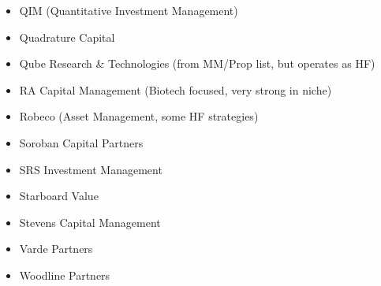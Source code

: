 \documentclass[11pt,a4paper]{article}
\begin{document}
\begin{multicols}{3}
\begin{itemize}[label=\textbullet, leftmargin=*, itemsep=1pt, parsep=0pt]
    \item QIM (Quantitative Investment Management)
    \item Quadrature Capital
    \item Qube Research \& Technologies (from MM/Prop list, but operates as HF)
    \item RA Capital Management (Biotech focused, very strong in niche)
    \item Robeco (Asset Management, some HF strategies)
    \item Soroban Capital Partners
    \item SRS Investment Management
    \item Starboard Value
    \item Stevens Capital Management
    \item Varde Partners
    \item Woodline Partners
\end{itemize}
\end{multicols}
\end{document}

